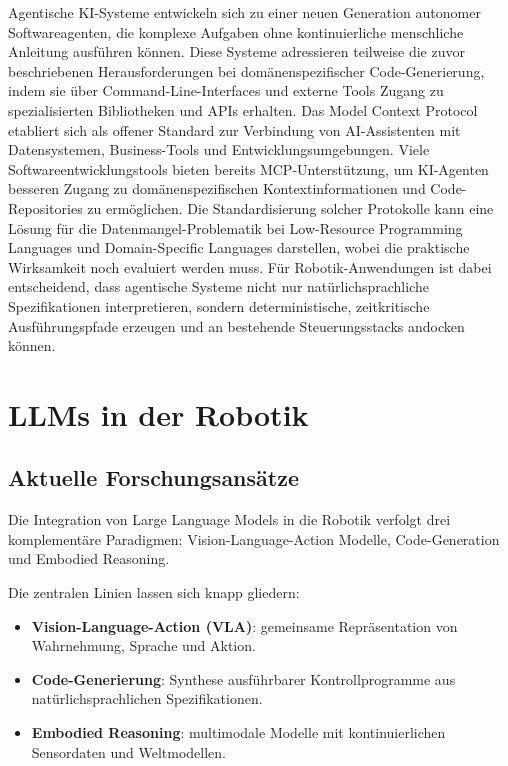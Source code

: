 \noindent Agentische KI-Systeme entwickeln sich zu einer neuen Generation
autonomer Softwareagenten, die komplexe Aufgaben ohne kontinuierliche
menschliche Anleitung ausführen können. Diese Systeme adressieren teilweise die
zuvor beschriebenen Herausforderungen bei domänenspezifischer Code-Generierung,
indem sie über Command-Line-Interfaces und externe Tools Zugang zu
spezialisierten Bibliotheken und APIs erhalten. Das Model Context Protocol
etabliert sich als offener Standard zur Verbindung von AI-Assistenten mit
Datensystemen, Business-Tools und Entwicklungsumgebungen.
Viele Softwareentwicklungstools bieten bereits MCP-Unterstützung, um KI-Agenten
besseren Zugang zu domänenspezifischen Kontextinformationen und
Code-Repositories zu ermöglichen. Die Standardisierung solcher Protokolle kann
eine Lösung für die Datenmangel-Problematik bei Low-Resource Programming
Languages und Domain-Specific Languages darstellen, wobei die praktische
Wirksamkeit noch evaluiert werden muss. Für Robotik-Anwendungen ist dabei
entscheidend, dass agentische Systeme nicht nur natürlichsprachliche
Spezifikationen interpretieren, sondern deterministische, zeitkritische
Ausführungspfade erzeugen und an bestehende Steuerungsstacks andocken können.

\section{LLMs in der Robotik}
\subsection{Aktuelle Forschungsansätze}

Die Integration von Large Language Models in die Robotik verfolgt drei
komplementäre Paradigmen: Vision-Language-Action Modelle, Code-Generation und
Embodied Reasoning.

\noindent Die zentralen Linien lassen sich knapp gliedern:
\begin{itemize}
  \item \textbf{Vision-Language-Action (VLA)}: gemeinsame
    Repräsentation von Wahrnehmung, Sprache und Aktion.
  \item \textbf{Code-Generierung}: Synthese ausführbarer
    Kontrollprogramme aus natürlichsprachlichen Spezifikationen.
  \item \textbf{Embodied Reasoning}: multimodale Modelle mit
    kontinuierlichen Sensordaten und Weltmodellen.
\end{itemize}

